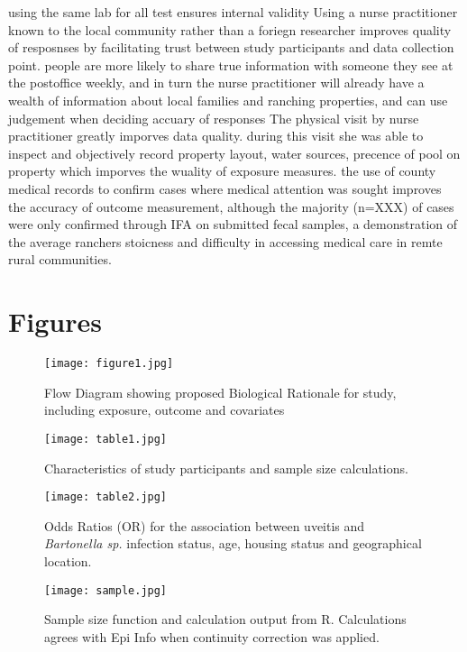 \documentclass[12pt]{article}
\begin{document}
		using the same lab for all test ensures internal validity
		Using a nurse practitioner known to the local community rather than a foriegn researcher improves quality of resposnses by facilitating trust between study participants and data collection point. people are more likely to share true information with someone they see at the postoffice weekly, and in turn the nurse practitioner will already have a wealth of information about local families and ranching properties, and can use judgement when deciding accuary of responses
		The physical visit by nurse practitioner greatly imporves data quality. during this visit she was able to inspect and objectively record property layout, water sources, precence of pool on property which imporves the wuality of exposure measures.
		the use of county medical records to confirm cases where medical attention was sought improves the accuracy of outcome measurement, although the majority (n=XXX) of cases were only confirmed through IFA on submitted fecal samples, a demonstration of the average ranchers stoicness and difficulty in accessing medical care in remte rural communities. 

		\flushpage
		
	\section{Figures}

\begin{figure*}[h!]
	\centering
	\texttt{[image: figure1.jpg]}
	\caption{Flow Diagram showing proposed Biological Rationale for study, including exposure, outcome and covariates }
	\label{fig:1}
\end{figure*}

\begin{figure*}[h!]
	\centering
	\texttt{[image: table1.jpg]}
	\caption{Characteristics of study participants and sample size calculations.}
	\label{tab:1}
\end{figure*}
 
\begin{figure*}[h!]
	\centering
	\texttt{[image: table2.jpg]}
	\caption{Odds Ratios (OR) for the association between uveitis and \emph{Bartonella sp.} infection status, age, housing status and geographical location.}
	\label{tab:2}
\end{figure*}

\begin{figure*}[h!]
	\centering
	\texttt{[image: sample.jpg]}
	\caption{Sample size function and calculation output from R. Calculations agrees with Epi Info when continuity correction was applied.}
	\label{fig:samplesizecalc}
\end{figure*}

\clearpage


\end{document}
